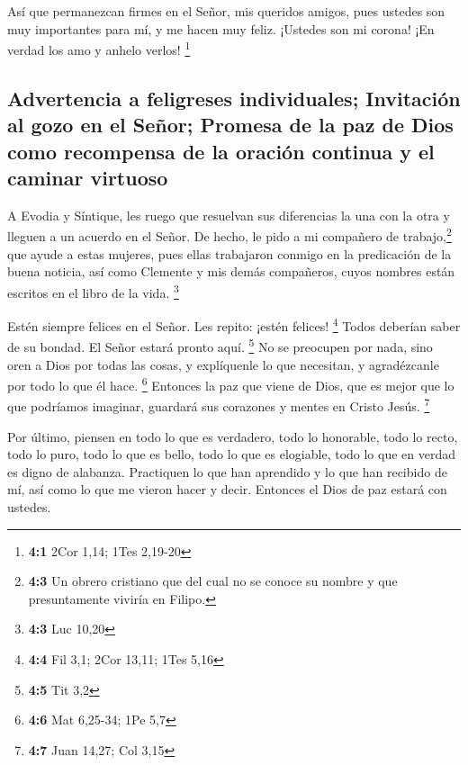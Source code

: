  Así que permanezcan firmes en el Señor, mis queridos
amigos, pues ustedes son muy importantes para mí, y me hacen muy feliz.
¡Ustedes son mi corona! ¡En verdad los amo y anhelo verlos! \footnote{\textbf{4:1}
  2Cor 1,14; 1Tes 2,19-20}

\hypertarget{advertencia-a-feligreses-individuales-invitaciuxf3n-al-gozo-en-el-seuxf1or-promesa-de-la-paz-de-dios-como-recompensa-de-la-oraciuxf3n-continua-y-el-caminar-virtuoso}{%
\subsection{Advertencia a feligreses individuales; Invitación al gozo en
el Señor; Promesa de la paz de Dios como recompensa de la oración
continua y el caminar
virtuoso}\label{advertencia-a-feligreses-individuales-invitaciuxf3n-al-gozo-en-el-seuxf1or-promesa-de-la-paz-de-dios-como-recompensa-de-la-oraciuxf3n-continua-y-el-caminar-virtuoso}}

 A Evodia y Síntique, les ruego que resuelvan sus
diferencias la una con la otra y lleguen a un acuerdo en el Señor.
 De hecho, le pido a mi compañero de trabajo,\footnote{\textbf{4:3}
  Un obrero cristiano que del cual no se conoce su nombre y que
  presuntamente viviría en Filipo.} que ayude a estas mujeres, pues
ellas trabajaron conmigo en la predicación de la buena noticia, así como
Clemente y mis demás compañeros, cuyos nombres están escritos en el
libro de la vida. \footnote{\textbf{4:3} Luc 10,20}

 Estén siempre felices en el Señor. Les repito: ¡estén
felices! \footnote{\textbf{4:4} Fil 3,1; 2Cor 13,11; 1Tes 5,16}
 Todos deberían saber de su bondad. El Señor estará pronto
aquí. \footnote{\textbf{4:5} Tit 3,2}  No se preocupen por
nada, sino oren a Dios por todas las cosas, y explíquenle lo que
necesitan, y agradézcanle por todo lo que él hace. \footnote{\textbf{4:6}
  Mat 6,25-34; 1Pe 5,7}  Entonces la paz que viene de
Dios, que es mejor que lo que podríamos imaginar, guardará sus corazones
y mentes en Cristo Jesús. \footnote{\textbf{4:7} Juan 14,27; Col 3,15}

 Por último, piensen en todo lo que es verdadero, todo lo
honorable, todo lo recto, todo lo puro, todo lo que es bello, todo lo
que es elogiable, todo lo que en verdad es digno de alabanza.
 Practiquen lo que han aprendido y lo que han recibido de
mí, así como lo que me vieron hacer y decir. Entonces el Dios de paz
estará con ustedes.

